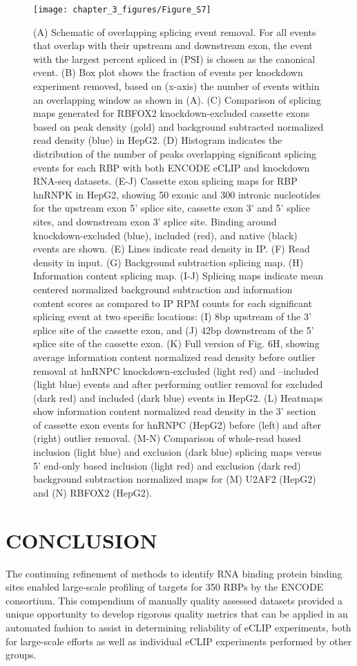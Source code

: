 \begin{figure}[ht]
  \centering
  \texttt{[image: chapter\_3\_figures/Figure\_S7]}
  \caption[Supplementary Figure 6. Considerations for design of splicing maps]{(A) Schematic of overlapping splicing event removal. For all events that overlap with their upstream and downstream exon, the event with the largest percent spliced in (PSI) is chosen as the canonical event. (B) Box plot shows the fraction of events per knockdown experiment removed, based on (x-axis) the number of events within an overlapping window as shown in (A). (C) Comparison of splicing maps generated for RBFOX2 knockdown-excluded cassette exons based on peak density (gold) and background subtracted normalized read density (blue) in HepG2. (D) Histogram indicates the distribution of the number of peaks overlapping significant splicing events for each RBP with both ENCODE eCLIP and knockdown RNA-seq datasets. (E-J) Cassette exon splicing maps for RBP hnRNPK in HepG2, showing 50 exonic and 300 intronic nucleotides for the upstream exon 5’ splice site, cassette exon 3’ and 5’ splice sites, and downstream exon 3’ splice site. Binding around knockdown-excluded (blue), included (red), and native (black) events are shown. (E) Lines indicate read density in IP. (F) Read density in input. (G) Background subtraction splicing map. (H) Information content splicing map. (I-J) Splicing maps indicate mean centered normalized background subtraction and information content scores as compared to IP RPM counts for each significant splicing event at two specific locations: (I) 8bp upstream of the 3’ splice site of the cassette exon, and (J) 42bp downstream of the 5’ splice site of the cassette exon. (K) Full version of Fig. 6H, showing average information content normalized read density before outlier removal at hnRNPC knockdown-excluded (light red) and –included (light blue) events and after performing outlier removal for excluded (dark red) and included (dark blue) events in HepG2. (L) Heatmaps show information content normalized read density in the 3’ section of cassette exon events for hnRNPC (HepG2) before (left) and after (right) outlier removal. (M-N) Comparison of whole-read based inclusion (light blue) and exclusion (dark blue) splicing maps versus 5’ end-only based inclusion (light red) and exclusion (dark red) background subtraction normalized maps for (M) U2AF2 (HepG2) and (N) RBFOX2 (HepG2).}
  \label{fig:Figure_S6}
\end{figure}

\section{CONCLUSION}
The continuing refinement of methods to identify RNA binding protein binding sites enabled large-scale profiling of targets for 350 RBPs by the ENCODE consortium. This compendium of manually quality assessed datasets provided a unique opportunity to develop rigorous quality metrics that can be applied in an automated fashion to assist in determining reliability of eCLIP experiments, both for large-scale efforts as well as individual eCLIP experiments performed by other groups.

